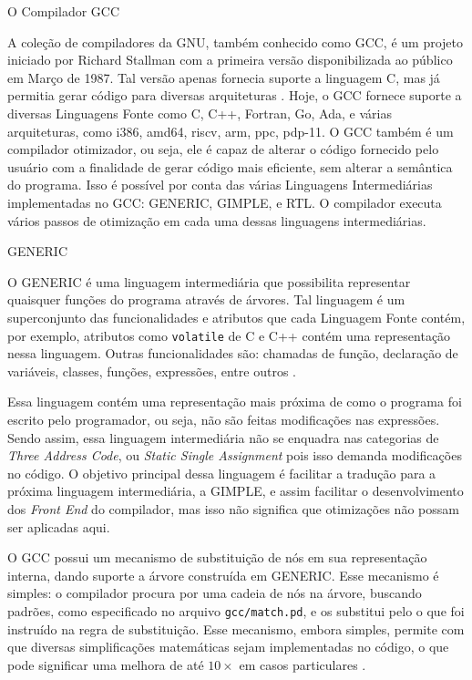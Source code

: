\begin{section}{O Compilador GCC}

A coleção de compiladores da GNU, também conhecido como GCC, é um projeto
iniciado por Richard Stallman com a primeira versão disponibilizada ao público
em Março de 1987. Tal versão apenas fornecia suporte a linguagem C, mas já permitia
    gerar código para diversas arquiteturas \citep{gcc_first_ver}.
Hoje, o GCC fornece suporte a diversas Linguagens Fonte como C, C++, Fortran, Go, Ada,
e várias arquiteturas, como i386, amd64, riscv, arm, ppc, pdp-11. O GCC também
é um compilador otimizador, ou seja, ele é capaz de alterar o código fornecido
pelo usuário com a finalidade de gerar código mais eficiente, sem alterar a semântica do programa. Isso é
possível por conta das várias Linguagens Intermediárias implementadas no
GCC: GENERIC, GIMPLE, e RTL. O compilador executa vários
passos de otimização em cada uma dessas linguagens intermediárias.

\begin{subsection}{GENERIC}

    O GENERIC é uma linguagem intermediária que possibilita representar quaisquer
funções do programa através de árvores. Tal linguagem é um superconjunto
das funcionalidades e atributos que cada Linguagem Fonte contém, por exemplo, atributos
como \texttt{volatile} de C e C++ contém uma representação nessa linguagem.
Outras funcionalidades são: chamadas de função, declaração de variáveis, classes,
funções, expressões, entre outros \citep{generic}.

    Essa linguagem contém uma representação mais próxima de como o programa foi
escrito pelo programador, ou seja, não são feitas modificações nas expressões.
Sendo assim, essa linguagem
intermediária não se enquadra nas categorias de \textit{Three Address Code},
ou \textit{Static Single Assignment} pois isso demanda modificações no código.
O objetivo principal dessa linguagem
é facilitar a tradução para a próxima linguagem intermediária, a GIMPLE, e assim
facilitar o desenvolvimento dos \textit{Front End} do compilador, mas isso não
significa que otimizações não possam ser aplicadas aqui.

    O GCC possui um mecanismo de substituição de nós em sua representação
interna, dando suporte a árvore construída em GENERIC. Esse mecanismo é simples: o
compilador procura por uma cadeia de nós na árvore, buscando padrões,
como especificado no arquivo \texttt{gcc/match.pd}, e os substitui pelo o que
foi instruído na regra de substituição. Esse mecanismo, embora simples, permite
com que diversas simplificações matemáticas sejam implementadas no código, o
que pode significar uma melhora de até $10\times$ em casos particulares
\citep{sinatan}.


\end{subsection}
\end{section}
